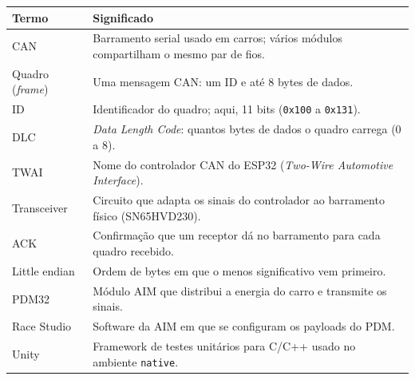\documentclass[11pt,a4paper]{article}
\begin{document}
\begin{center}
\begin{tabularx}{\textwidth}{lX}
\toprule
\textbf{Termo} & \textbf{Significado} \\
\midrule
CAN & Barramento serial usado em carros; vários módulos compartilham o mesmo par de fios. \\
Quadro (\emph{frame}) & Uma mensagem CAN: um ID e até 8 bytes de dados. \\
ID & Identificador do quadro; aqui, 11 bits (\texttt{0x100} a \texttt{0x131}). \\
DLC & \emph{Data Length Code}: quantos bytes de dados o quadro carrega (0 a 8). \\
TWAI & Nome do controlador CAN do ESP32 (\emph{Two-Wire Automotive Interface}). \\
Transceiver & Circuito que adapta os sinais do controlador ao barramento físico (SN65HVD230). \\
ACK & Confirmação que um receptor dá no barramento para cada quadro recebido. \\
Little endian & Ordem de bytes em que o menos significativo vem primeiro. \\
PDM32 & Módulo AIM que distribui a energia do carro e transmite os sinais. \\
Race Studio & Software da AIM em que se configuram os payloads do PDM. \\
Unity & Framework de testes unitários para C/C++ usado no ambiente \texttt{native}. \\
\bottomrule
\end{tabularx}
\end{center}
\end{document}
